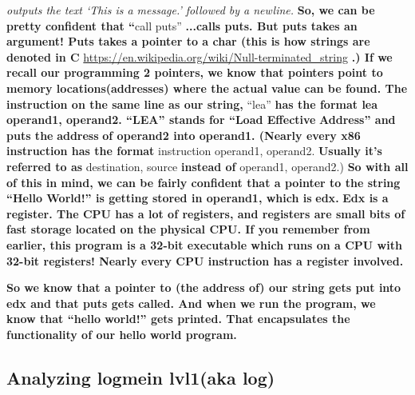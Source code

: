 \textit{outputs the text `This is a message.' followed by a newline.\newline
\newline
}\textbf{So, we can be pretty confident that ``}call puts'' \textbf{...calls puts. But puts takes an argument! Puts
takes a pointer to a char (this is how strings are denoted in C
}\url{https://en.wikipedia.org/wiki/Null-terminated_string}\textbf{ .) If we recall our programming 2 pointers, we know
that pointers point to memory locations(}\textbf{\textcolor[rgb]{0.21960784,0.4627451,0.11372549}{addresses}}\textbf{)
where the actual value can be found. \newline
The instruction on the same line as our string, }{}``lea''\textbf{ has the format lea operand1, operand2. ``LEA'' stands
for ``Load Effective }\textbf{\textcolor[rgb]{0.21960784,0.4627451,0.11372549}{Address}}\textbf{{}'' and puts the
}\textbf{\textcolor[rgb]{0.21960784,0.4627451,0.11372549}{address}}\textbf{ of operand2 into operand1. (Nearly every
x86 instruction has the format }instruction operand1, operand2. \textbf{Usually it's referred to as }destination,
source\textbf{ instead of }operand1, operand2.)\textbf{  \newline
So with all of this in mind, we can be fairly confident that a pointer to the string ``Hello World!'' is getting stored
in operand1, which is }\textbf{\textcolor[rgb]{0.21960784,0.4627451,0.11372549}{edx}}\textbf{.
}\textbf{\textcolor[rgb]{0.21960784,0.4627451,0.11372549}{Edx }}\textbf{is a
}\textbf{\textcolor[rgb]{0.21960784,0.4627451,0.11372549}{register}}\textbf{. The CPU has a lot of registers, and
registers are small bits of fast storage located on the physical CPU. If you remember from earlier, this program is a
32-bit executable which runs on a CPU with 32-bit registers! Nearly every CPU instruction has a register involved.}

{\centering
  
 \par}
\textbf{So we know that a pointer to (the address of) our string gets put into edx and that puts gets called. And when
we run the program, we know that ``hello world!'' gets printed. That encapsulates the functionality of our hello world
program. }

\subsection{Analyzing logmein lvl1(aka log)}

